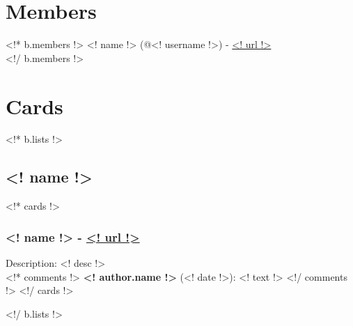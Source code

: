



\renewcommand{\currentchapter}{<! b.title !>}
\renewcommand{\today}{<!* b.desc !><! b.desc !><!/ b.desc !><!~ b.desc !>Created by Trello2LaTeX<!/ b.desc !>}
\renewcommand{\currentpart}{Revision <! b.lastmodified !>}

\section{Members}
<!* b.members !>
<! name !> (@<! username !>) - \url{<! url !>}\\
<!/ b.members !>

\section{Cards}
<!* b.lists !>
\subsection{<! name !>}

<!* cards !>
\subsubsection{<! name !> - \url{<! url !>}}
Description: <! desc !>\\
<!* comments !>
{\bf <! author.name !>} (<! date !>): <! text !>
<!/ comments !>
<!/ cards !>

<!/ b.lists !>


